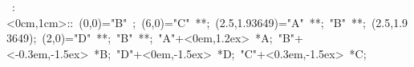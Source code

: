 
\hbox{
\xy    <1cm,0cm>:<0cm,1cm>::
       (0,0)="B" ; (6,0)="C" **\dir{-}; 
       (2.5,1.93649)="A" **\dir{-}; "B" **\dir{-};
       (2.5,1.93649); (2,0)="D" **\dir{-}; "B" **\dir{-};
	 "A"+<0em,1.2ex> *{A};
	 "B"+<-0.3em,-1.5ex> *{B};
	 "D"+<0em,-1.5ex> *{D};
	 "C"+<0.3em,-1.5ex> *{C};
       \endxy}
	   
